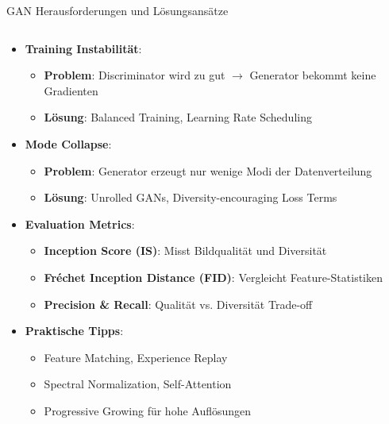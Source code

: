 \documentclass[aspectratio=1610, xcolor=dvipsnames, 9pt]{beamer}
\begin{document}
\begin{frame}{GAN Herausforderungen und Lösungsansätze}
  \begin{columns}
    \begin{column}{1\textwidth}
      \begin{itemize}
        \item \textbf{Training Instabilität}:
        \begin{itemize}
          \item \textbf{Problem}: Discriminator wird zu gut $\rightarrow$ Generator bekommt keine Gradienten
          \item \textbf{Lösung}: Balanced Training, Learning Rate Scheduling
        \end{itemize}
        \item \textbf{Mode Collapse}:
        \begin{itemize}
          \item \textbf{Problem}: Generator erzeugt nur wenige Modi der Datenverteilung
          \item \textbf{Lösung}: Unrolled GANs, Diversity-encouraging Loss Terms
        \end{itemize}
        \item \textbf{Evaluation Metrics}:
        \begin{itemize}
          \item \textbf{Inception Score (IS)}: Misst Bildqualität und Diversität
          \item \textbf{Fréchet Inception Distance (FID)}: Vergleicht Feature-Statistiken
          \item \textbf{Precision \& Recall}: Qualität vs. Diversität Trade-off
        \end{itemize}
        \item \textbf{Praktische Tipps}:
        \begin{itemize}
          \item Feature Matching, Experience Replay
          \item Spectral Normalization, Self-Attention
          \item Progressive Growing für hohe Auflösungen
        \end{itemize}
      \end{itemize}
    \end{column}
  \end{columns}
\end{frame}
\end{document}
